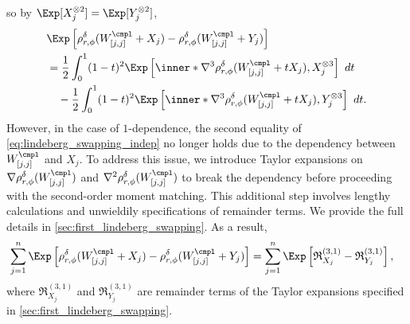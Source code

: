 \documentclass[aos]{imsart}
\begin{document}
so by $\Exp[X_j^{\otimes 2}] = \Exp[Y_j^{\otimes 2}]$,
\begin{equation*} 
\begin{aligned}
    & \Exp\left[\rho_{r,\phi}^\delta(W^\cmpl_{[j,j]} + X_j) - \rho_{r,\phi}^\delta(W^\cmpl_{[j,j]} + Y_j)\right]\\
    & = \frac{1}{2} \int_0^1 (1-t)^2 \Exp\left[ 
    \inner*{ \nabla^3 \rho_{r,\phi}^\delta(W^\cmpl_{[j,j]} + t X_j), X_j^{\otimes 3}} \right] ~dt \\
    & \quad - \frac{1}{2} \int_0^1 (1-t)^2 \Exp\left[ 
    \inner*{ \nabla^3 \rho_{r,\phi}^\delta(W^\cmpl_{[j,j]} + t X_j), Y_j^{\otimes 3}} \right] ~dt.
\end{aligned}
\end{equation*}
However, in the case of $1$-dependence, the second equality of \cref{eq:lindeberg_swapping_indep} no longer holds due to the dependency between $W_{[j,j]}^\cmpl$ and $X_j$. To address this issue, we introduce Taylor expansions on $\nabla\rho_{r,\phi}^\delta(W^\cmpl_{[j,j]})$ and $\nabla^2 \rho_{r,\phi}^\delta(W^\cmpl_{[j,j]})$ to break the dependency before proceeding with the second-order moment matching. This additional step involves lengthy calculations and unwieldily specifications of remainder terms. We provide the full details in \cref{sec:first_lindeberg_swapping}.
As a result,
\begin{equation} \label{eq:first_lindeberg_result_3N}
\begin{aligned}
    & \sum_{j=1}^{n} \Exp \left[
        \rho_{r,\phi}^\delta(W^\cmpl_{[j,j]} + X_j)
        - \rho_{r,\phi}^\delta(W^\cmpl_{[j,j]} + Y_j) \right] 
    = \sum_{j=1}^{n} \Exp \left[ \mathfrak{R}_{X_j}^{(3,1)} 
        - \mathfrak{R}_{Y_j}^{(3,1)} \right],
\end{aligned}
\end{equation}
where $\mathfrak{R}_{X_j}^{(3,1)}$ and $\mathfrak{R}_{Y_j}^{(3,1)}$ are remainder terms of the Taylor expansions specified in \cref{sec:first_lindeberg_swapping}. 
\end{document}
